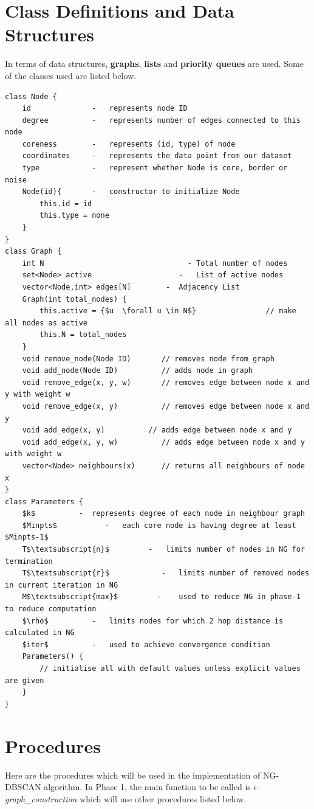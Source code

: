 \documentclass[acmsmall]{acmart}
\begin{document}
\section* {Class Definitions and Data Structures}
In terms of data structures, \textbf{graphs}, \textbf{lists} and \textbf{priority queues} are used. Some of the classes used are listed below.
\begin{lstlisting}
class Node {
    id              -   represents node ID
    degree          -   represents number of edges connected to this node
    coreness        -   represents (id, type) of node
    coordinates     -   represents the data point from our dataset
    type            - 	represent whether Node is core, border or noise
    Node(id){       - 	constructor to initialize Node
        this.id = id
        this.type = none
    }
}
class Graph { 
    int N 					              -	Total number of nodes
    set<Node> active 			        - 	List of active nodes
    vector<Node,int> edges[N] 	     -	Adjacency List
    Graph(int total_nodes) {
    	this.active = {$u  \forall u \in N$}                // make all nodes as active
    	this.N = total_nodes
    }
    void remove_node(Node ID)       // removes node from graph
    void add_node(Node ID)          // adds node in graph
    void remove_edge(x, y, w)       // removes edge between node x and y with weight w
    void remove_edge(x, y)          // removes edge between node x and y
    void add_edge(x, y)          // adds edge between node x and y
    void add_edge(x, y, w)          // adds edge between node x and y with weight w
    vector<Node> neighbours(x)      // returns all neighbours of node x
}
class Parameters {
	$k$		     -	represents degree of each node in neighbour graph
	$Minpts$           -   each core node is having degree at least $Minpts-1$
    T$\textsubscript{n}$         -   limits number of nodes in NG for termination
    T$\textsubscript{r}$	        -   limits number of removed nodes in current iteration in NG
    M$\textsubscript{max}$         -	used to reduce NG in phase-1 to reduce computation
    $\rho$          -   limits nodes for which 2 hop distance is calculated in NG
    $iter$          -	used to achieve convergence condition
	Parameters() {
	    // initialise all with default values unless explicit values are given
    }
}
\end{lstlisting}

\section* {Procedures}
Here are the procedures which will be used in the implementation of NG-DBSCAN algorithm. \newline
In Phase 1, the main function to be called is \textit{$\epsilon$-graph\_construction} which will use other procedures listed below.
\end{document}
